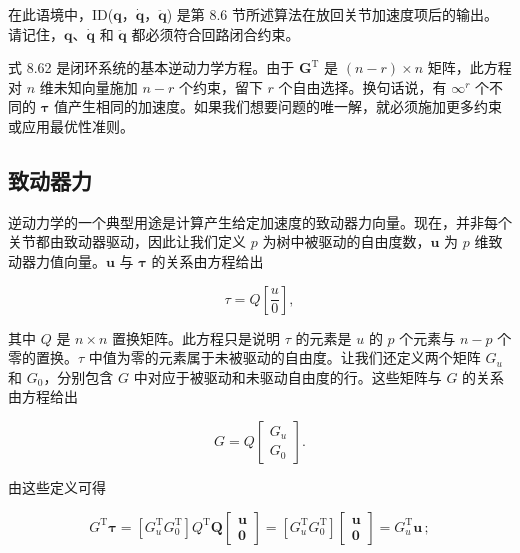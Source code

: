 \documentclass[10pt,a4paper]{book}
\theoremstyle{thmstyle} %
\theoremstyle{defstyle} %
\theoremstyle{prostyle} %
\begin{document}
在此语境中，ID($\boldsymbol{q}$，$\dot{\boldsymbol{q}}$，$\ddot{\boldsymbol{q}}$) 是第 8.6 节所述算法在放回关节加速度项后的输出。请记住，$\boldsymbol{q}$、$\dot{\boldsymbol{q}}$ 和 $\ddot{\boldsymbol{q}}$ 都必须符合回路闭合约束。



式 8.62 是闭环系统的基本逆动力学方程。由于 $\boldsymbol{G}^{\mathrm{T}}$ 是 $(n-r) \times n$ 矩阵，此方程对 $n$ 维未知向量施加 $n-r$ 个约束，留下 $r$ 个自由选择。换句话说，有 $\infty^{r}$ 个不同的 $\boldsymbol{\tau}$ 值产生相同的加速度。如果我们想要问题的唯一解，就必须施加更多约束或应用最优性准则。



\subsection{致动器力}





逆动力学的一个典型用途是计算产生给定加速度的致动器力向量。现在，并非每个关节都由致动器驱动，因此让我们定义 $p$ 为树中被驱动的自由度数，$\boldsymbol{u}$ 为 $p$ 维致动器力值向量。$\boldsymbol{u}$ 与 $\boldsymbol{\tau}$ 的关系由方程给出



$$
τ = Q \left[ \frac { u } { 0 } \right] ,
$$



其中 $Q$ 是 $n \times n$ 置换矩阵。此方程只是说明 $\tau$ 的元素是 $u$ 的 $p$ 个元素与 $n-p$ 个零的置换。$\tau$ 中值为零的元素属于未被驱动的自由度。让我们还定义两个矩阵 $G_u$ 和 $G_0$，分别包含 $G$ 中对应于被驱动和未驱动自由度的行。这些矩阵与 $G$ 的关系由方程给出



$$
G = Q \left[ \begin{array}{l} { { G _ { u } } } \\{ { G _ { 0 } } } \end{array} \right] .
$$



由这些定义可得



$$
G ^{\mathrm { T} } \boldsymbol { \tau } = \left[ G _ { u } ^{\mathrm { T} }  G _ { 0 } ^{\mathrm { T} } \right] Q ^{\mathrm { T} } \boldsymbol { Q } \left[ \begin{array}{l} { \boldsymbol { u } } \\{ \boldsymbol { 0 } } \end{array} \right] = \left[ G _ { u } ^{\mathrm { T} }  G _ { 0 } ^{\mathrm { T} } \right] \left[ \begin{array}{l} { \boldsymbol { u } } \\{ \boldsymbol { 0 } } \end{array} \right] = G _ { u } ^{\mathrm { T} } \boldsymbol { u } \, ;
$$
\end{document}
